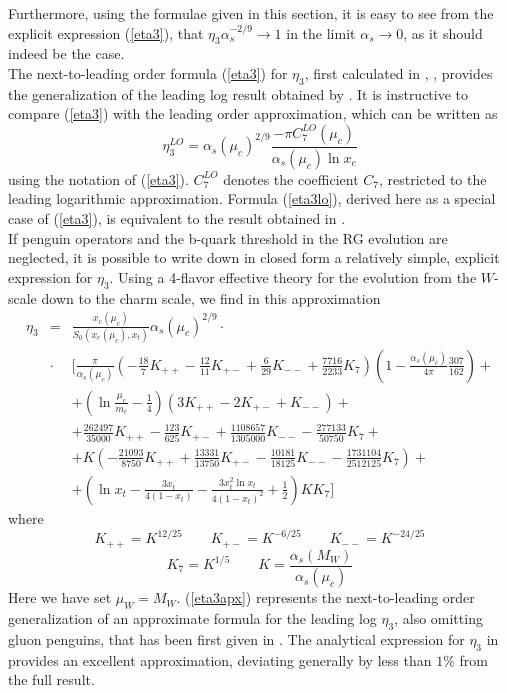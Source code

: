 Furthermore, using the formulae given in this
section, it is easy to see from the explicit expression (\ref{eta3}),
that $\eta_3 \alpha^{-2/9}_s\to 1$ in the limit $\alpha_s\to 0$,
as it should indeed be the case.
\\
The next-to-leading order formula (\ref{eta3}) for $\eta_3$, first
calculated in \cite{herrlichnierste:95}, \cite{nierste:95}, provides
the generalization of the leading log result obtained by
\cite{gilmanwise:83}. It is instructive to compare (\ref{eta3}) with
the leading order approximation, which can be written as
\begin{equation}\label{eta3lo}
\eta^{LO}_3=\alpha_s(\mu_c)^{2/9}
\frac{-\pi C^{LO}_7(\mu_c)}{\alpha_s(\mu_c)\ln x_c}
\end{equation}
using the notation of (\ref{eta3}). $C^{LO}_7$ denotes the coefficient
$C_7$, restricted to the leading logarithmic approximation.
Formula (\ref{eta3lo}), derived here as a special case of (\ref{eta3}),
is equivalent to the result obtained in \cite{gilmanwise:83}.
\\
If penguin operators and the b-quark threshold in the RG
evolution are neglected, it is possible to write down in closed form
a relatively simple, explicit expression for $\eta_3$. Using a 4-flavor
effective theory for the evolution from the $W$-scale down to the
charm scale, we find in this approximation
\begin{eqnarray}\label{eta3apx}
\eta_3 &=& \frac{x_c(\mu_c)}{S_0(x_c(\mu_c),x_t)}\alpha_s(\mu_c)^{2/9}\cdot
\nonumber \\
&\cdot& \Biggl[ \frac{\pi}{\alpha_s(\mu_c)}\left(-\frac{18}{7}K_{++}-
\frac{12}{11}K_{+-}+\frac{6}{29}K_{--}+\frac{7716}{2233}K_7\right)
\left(1-\frac{\alpha_s(\mu_c)}{4\pi}\frac{307}{162}\right)+ \nonumber \\
& & + \left(\ln\frac{\mu_c}{m_c}-\frac{1}{4}\right)
\left(3 K_{++}-2 K_{+-}+ K_{--}\right) + \nonumber \\
& & +\frac{262497}{35000}K_{++}-\frac{123}{625}K_{+-}+
\frac{1108657}{1305000}K_{--}-\frac{277133}{50750}K_7+ \nonumber \\
& & + K\left(-\frac{21093}{8750}K_{++}+\frac{13331}{13750}K_{+-}-
\frac{10181}{18125}K_{--}-\frac{1731104}{2512125}K_7\right)+ \nonumber \\
& & +\left(\ln x_t-\frac{3 x_t}{4(1-x_t)}-\frac{3x^2_t\ln x_t}{4(1-x_t)^2}
+\frac{1}{2}\right) K K_7 \Biggr]
\end{eqnarray}
where
\begin{equation}\label{kpm}
K_{++}=K^{12/25}\qquad K_{+-}=K^{-6/25}\qquad K_{--}=K^{-24/25}
\end{equation}
\begin{equation}\label{k7k}
K_7=K^{1/5}\qquad  K=\frac{\alpha_s(M_W)}{\alpha_s(\mu_c)}
\end{equation}
Here we have set $\mu_W=M_W$. (\ref{eta3apx}) represents the
next-to-leading order generalization of an approximate formula for the
leading log $\eta_3$, also omitting gluon penguins, that has been first
given in \cite{gilmanwise:83}.
The analytical expression for $\eta_3$ in 
provides an excellent approximation, deviating generally by less
than $1\%$ from the full result.

